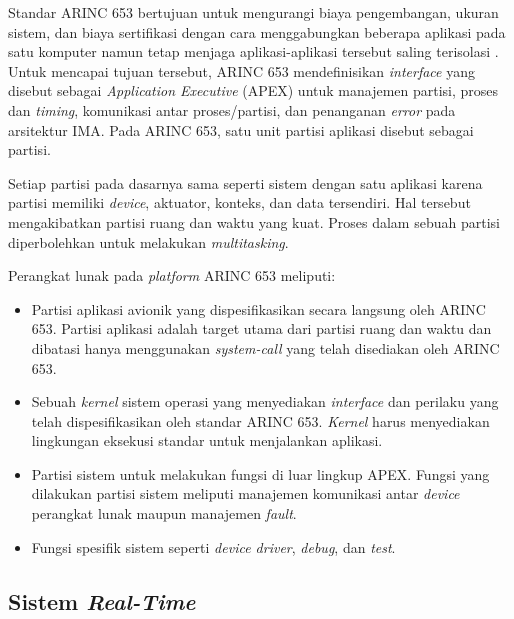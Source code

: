 Standar ARINC 653 bertujuan untuk mengurangi biaya pengembangan, ukuran sistem, dan biaya
sertifikasi dengan cara menggabungkan beberapa aplikasi pada satu komputer namun tetap menjaga
aplikasi-aplikasi tersebut saling terisolasi
\citep[pp.~3-30]{AirlinesElectronicEngineeringCommittee2012}.  Untuk mencapai tujuan tersebut,
ARINC 653 mendefinisikan \textit{interface} yang disebut sebagai \textit{Application Executive}
(APEX) untuk manajemen partisi, proses dan \textit{timing}, komunikasi antar proses/partisi, dan
penanganan \textit{error} pada arsitektur IMA.  Pada ARINC 653, satu unit partisi aplikasi
disebut sebagai partisi.

Setiap partisi pada dasarnya sama seperti sistem dengan satu aplikasi karena partisi memiliki
\textit{device}, aktuator, konteks, dan data tersendiri.  Hal tersebut mengakibatkan partisi
ruang dan waktu yang kuat.  Proses dalam sebuah partisi diperbolehkan untuk melakukan
\textit{multitasking}.

Perangkat lunak pada \textit{platform} ARINC 653 meliputi:

\begin{itemize}

    \item Partisi aplikasi avionik yang dispesifikasikan secara langsung oleh ARINC 653. Partisi
    	    aplikasi adalah target utama dari partisi ruang dan waktu dan dibatasi hanya
    	    menggunakan \textit{system-call} yang telah disediakan oleh ARINC 653.

    \item Sebuah \textit{kernel} sistem operasi yang menyediakan \textit{interface} dan perilaku
    	    yang telah dispesifikasikan oleh standar ARINC 653. \textit{Kernel} harus
    	    menyediakan lingkungan eksekusi standar untuk menjalankan aplikasi.

    \item Partisi sistem untuk melakukan fungsi di luar lingkup APEX. Fungsi yang dilakukan
    	    partisi sistem meliputi manajemen komunikasi antar \textit{device} perangkat lunak
    	    maupun manajemen \textit{fault}.

    \item Fungsi spesifik sistem seperti \textit{device driver}, \textit{debug}, dan
    	    \textit{test}.

\end{itemize}

\subsection{Sistem \textit{Real-Time}}

